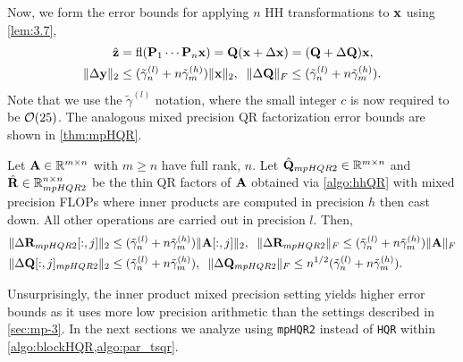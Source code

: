 Now, we form the error bounds for applying $n$ HH transformations to $\mathbf{x}$ using \cref{lem:3.7},
\begin{align}
\hat{\bb{z}} &= \fl(\bb{P}_1\cdots\bb{P}_n\bb{x})=\bb{Q} (\bb{x} +\Delta \bb{x}) = (\bb{Q} + \Delta \bb{Q})\bb{x},\\
\|\Delta \bb{y}\|_2 &\leq (\tilde{\gamma}_n^{(l)}+n\tilde{\gamma}_m^{(h)})\|\bb{x}\|_2,\;\; \|\Delta \bb{Q}\|_F\leq (\tilde{\gamma}_n^{(l)}+n\tilde{\gamma}_m^{(h)}).\label{eqn:mp19.3}
\end{align} 
Note that we use the $\tilde{\gamma}^{(l)}$ notation, where the small integer $c$ is now required to be $\mathcal{O}(25)$.
The analogous mixed precision QR factorization error bounds are shown in \cref{thm:mpHQR}.
\begin{theorem}
	\label{thm:mpHQR}
	Let $\mathbf{A}\in\mathbb{R}^{m\times n}$ with $m\geq n$ have full rank, $n$. 
	Let $\hat{\mathbf{Q}}_{mpHQR2}\in\mathbb{R}^{m\times n}$ and $\hat{\mathbf{R}}\in\mathbb{R}^{n\times n}_{mpHQR2}$ be the thin QR factors of $\mathbf{A}$ obtained via \cref{algo:hhQR} with mixed precision FLOPs where inner products are computed in precision $h$ then cast down.
	All other operations are carried out in precision $l$.
	Then,
	\begin{align}
	\|\Delta \bb{R}_{mpHQR2}[:,j]\|_2&\leq (\tilde{\gamma}_n^{(l)}+n\tilde{\gamma}_m^{(h)}) \|\bb{A}[:,j]\|_2,\;\; \|\Delta \bb{R}_{mpHQR2}\|_F\leq (\tilde{\gamma}_n^{(l)}+n\tilde{\gamma}_m^{(h)}) \|\bb{A}\|_F \label{eqn:mpHQR2R}\\
	\|\Delta \bb{Q}[:,j]_{mpHQR2}\|_2&\leq (\tilde{\gamma}_n^{(l)}+n\tilde{\gamma}_m^{(h)}),\;\; \|\Delta \bb{Q}_{mpHQR2}\|_F \leq n^{1/2} (\tilde{\gamma}_n^{(l)}+n\tilde{\gamma}_m^{(h)})\label{eqn:mpHQR2Q}.
	\end{align}
\end{theorem}
Unsurprisingly, the inner product mixed precision setting yields higher error bounds as it uses more low precision arithmetic than the settings described in \cref{sec:mp-3}. 
In the next sections we analyze using {\tt mpHQR2} instead of {\tt HQR} within \cref{algo:blockHQR,algo:par_tsqr}.

